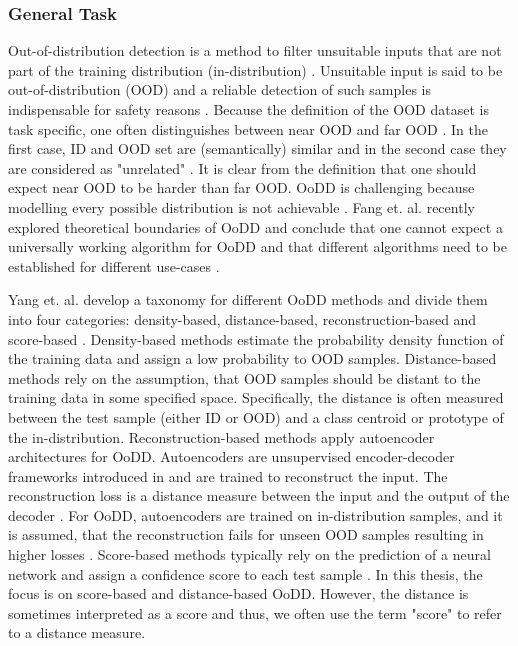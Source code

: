 \subsubsection{General Task}
Out-of-distribution detection is a method to filter unsuitable inputs that are not part of the training distribution (in-distribution) \citep{Yang2021}.
Unsuitable input is said to be out-of-distribution (OOD) and a reliable detection of such samples is indispensable for safety reasons \citep{Yang2021}.
Because the definition of the OOD dataset is task specific, one often distinguishes between near OOD and far OOD \citep{Winkens2020}.
In the first case, ID and OOD set are (semantically) similar and in the second case they are considered as "unrelated" \citep{Winkens2020}.
It is clear from the definition that one should expect near OOD to be harder than far OOD.
OoDD is challenging because modelling every possible distribution is not achievable \citep{Salehi2022}.
Fang et. al. recently explored theoretical boundaries of OoDD and conclude that one cannot expect a universally working algorithm for OoDD and that different algorithms need to be established for different use-cases \citep{Fang2023}.
\par
Yang et. al. develop a taxonomy for different OoDD methods and divide them into four categories: density-based, distance-based, reconstruction-based and score-based \citep{Yang2021}.
Density-based methods estimate the probability density function of the training data and assign a low probability to OOD samples.
Distance-based methods rely on the assumption, that OOD samples should be distant to the training data in some specified space.
Specifically, the distance is often measured between the test sample (either ID or OOD) and a class centroid or prototype of the in-distribution.
Reconstruction-based methods apply autoencoder architectures for OoDD.
Autoencoders are unsupervised encoder-decoder frameworks introduced in \citep{Rumelhart1986} and are trained to reconstruct the input.
The reconstruction loss is a distance measure between the input and the output of the decoder \citep{Baldi2012, Bank2020}.
For OoDD, autoencoders are trained on in-distribution samples, and it is assumed, that the reconstruction fails for unseen OOD samples resulting in higher losses \citep{Denouden2018}.
Score-based methods typically rely on the prediction of a neural network and assign a confidence score to each test sample \citep{Yang2021}.
In this thesis, the focus is on score-based and distance-based OoDD.
However, the distance is sometimes interpreted as a score and thus, we often use the term "score" to refer to a distance measure.
